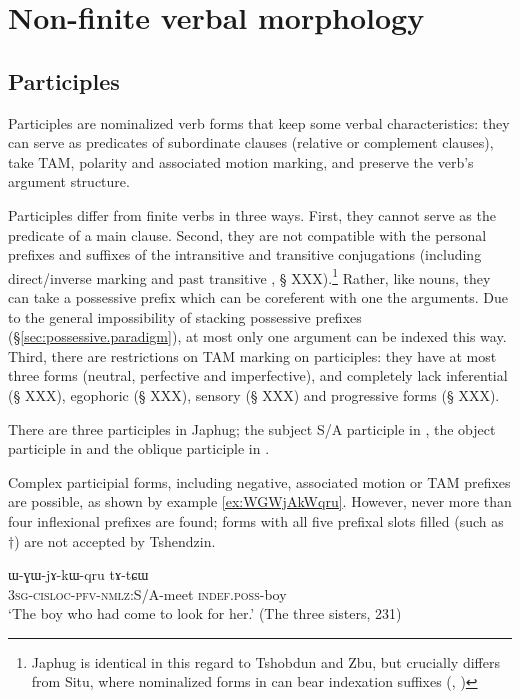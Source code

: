 \chapter{Non-finite verbal morphology}

\section{Participles}
Participles are nominalized verb forms that keep some verbal characteristics: they can serve as predicates of subordinate clauses (relative or complement clauses), take TAM, polarity and associated motion marking, and preserve the verb's argument structure.

Participles differ from finite verbs in three ways. First, they cannot serve as the predicate of a main clause. Second, they are not compatible with the personal prefixes and suffixes of the intransitive and transitive conjugations (including direct/inverse marking and past transitive , § XXX).\footnote{Japhug is identical in this regard to Tshobdun and Zbu, but crucially differs from Situ, where nominalized forms in  can bear indexation suffixes (\citet{jackson06guanxiju}, \citet{jacksonlin07}) } Rather, like nouns, they can take a possessive prefix which can be coreferent with one the arguments. Due to the general impossibility of stacking possessive prefixes (§\ref{sec:possessive.paradigm}), at most only one argument can be indexed this way. Third, there are restrictions on TAM marking on participles: they have at most three forms (neutral, perfective and imperfective), and completely lack inferential (§ XXX), egophoric (§ XXX), sensory (§ XXX) and progressive forms (§ XXX).

There are three participles in Japhug; the subject S/A participle in , the object participle in  and the oblique participle in . 

Complex participial forms, including negative, associated motion or TAM prefixes are possible, as shown by example \ref{ex:WGWjAkWqru}. However, never more than four inflexional prefixes are found; forms with all five prefixal slots filled (such as $\dagger$) are not accepted by Tshendzin.

 \begin{exe}
\ex \label{ex:WGWjAkWqru}
\gll ɯ-ɣɯ-jɤ-kɯ-qru tɤ-tɕɯ  \\
  \textsc{3sg}-\textsc{cisloc}-\textsc{pfv}-\textsc{nmlz}:S/A-meet \textsc{indef}.\textsc{poss}-boy   \\
\glt `The boy who had come to look for her.' (The three sisters, 231)
 \end{exe}


